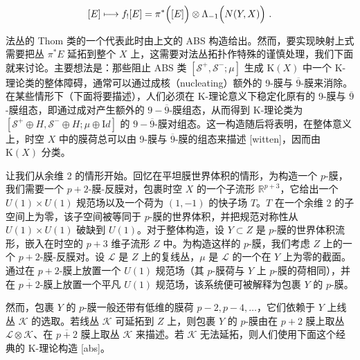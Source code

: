 \documentclass[11pt,a4paper]{ctexart}
\begin{document}
\[[E]\longmapsto f_![E]=\pi^*\Bigl([E]\Bigr)\otimes\Lambda_{-1}\Bigl(N(Y,X)\Bigr)
\ .\]

法丛的 Thom 类的一个代表此时由上文的 ABS 构造给出。然而，要实现映射上式需要把丛 \(\pi^*E\) 延拓到整个 \(X\) 上，这需要对法丛拓扑作特殊的谨慎处理，我们下面就来讨论。主要想法是：那些阻止 ABS 类 \([{\mathcal S}^+,{\mathcal S}^-;\mu]\) 生成 \({\mathrm K}(X)\) 中一个 K-理论类的整体障碍，通常可以通过成核（nucleating）额外的 9-膜与 \(\overline{9}\)-膜来消除。在某些情形下（下面将要描述），人们必须在 K-理论意义下稳定化原有的 9-膜与 \(\overline{9}\)-膜组态，即通过成对产生额外的 \(9-\overline{9}\)-膜组态，从而得到 K-理论类为 \([{\mathcal S}^+\oplus H,{\mathcal S}^-\oplus H;\mu\oplus{\mathrm Id}]\) 的 \(9-\overline{9}\)-膜对组态。这一构造随后将表明，在整体意义上，时空 \(X\) 中的膜荷总可以由 9-膜与 \(\overline{9}\)-膜的组态来描述 [witten]，因而由 \({\mathrm K}(X)\) 分类。

让我们从余维 2 的情形开始。回忆在平坦膜世界体积的情形，为构造一个 \(p\)-膜，我们需要一个 \(p+2\)-膜-反膜对，包裹时空 \(X\) 的一个子流形 \({\mathbb{R}}^{p+3}\)，它给出一个 \(U(1)\times U(1)\) 规范场以及一个荷为 \((1,-1)\) 的快子场 \(T\)。\(T\) 在一个余维 2 的子空间上为零，该子空间被等同于 \(p\)-膜的世界体积，并把规范对称性从 \(U(1)\times U(1)\) 破缺到 \(U(1)\)。对于整体构造，设 \(Y\subset Z\) 是 \(p\)-膜的世界体积流形，嵌入在时空的 \(p+3\) 维子流形 \(Z\) 中。为构造这样的 \(p\)-膜，我们考虑 \(Z\) 上的一个 \(p+2\)-膜-反膜对。设 \({\mathcal L}\) 是 \(Z\) 上的复线丛，\(\mu\) 是 \({\mathcal L}\) 的一个在 \(Y\) 上为零的截面。通过在 \(p+2\)-膜上放置一个 \(U(1)\) 规范场（其 \(p\)-膜荷与 \(Y\) 上 \(p\)-膜的荷相同），并在 \(\overline{p+2}\)-膜上放置一个平凡 \(U(1)\) 规范场，该系统便可被解释为包裹 \(Y\) 的 \(p\)-膜。

然而，包裹 \(Y\) 的 \(p\)-膜一般还带有低维的膜荷 \(p-2,p-4,\dots\)，它们依赖于 \(Y\) 上线丛 \({\mathcal K}\) 的选取。若线丛 \({\mathcal K}\) 可延拓到 \(Z\) 上，则包裹 \(Y\) 的 \(p\)-膜由在 \(p+2\) 膜上取丛 \({\mathcal L}\otimes{\mathcal K}\)、在 \(\overline{p+2}\) 膜上取丛 \({\mathcal K}\) 来描述。若 \({\mathcal K}\) 无法延拓，则人们使用下面这个经典的 K-理论构造 [abs]。
\end{document}
